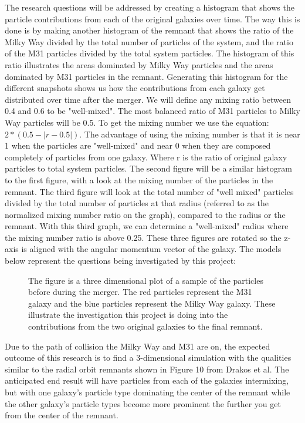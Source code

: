 \documentclass[linenumbers,trackchanges,twocolumn]{aastex7}
\begin{document}
The research questions will be addressed by creating a histogram that shows the particle contributions from each of the original galaxies over time. The way this is done is by making another histogram of the remnant that shows the ratio of the Milky Way divided by the total number of particles of the system, and the ratio of the M31 particles divided by the total system particles. The histogram of this ratio illustrates the areas dominated by Milky Way particles and the areas dominated by M31 particles in the remnant. Generating this histogram for the different snapshots shows us how the contributions from each galaxy get distributed over time after the merger. We will define any mixing ratio between 0.4 and 0.6 to be "well-mixed". The most balanced ratio of M31 particles to Milky Way particles will be 0.5. To get the mixing number we use the equation: \(2*(0.5-|r-0.5|)\). The advantage of using the mixing number is that it is near 1 when the particles are "well-mixed" and near 0 when they are composed completely of particles from one galaxy. Where r is the ratio of original galaxy particles to total system particles. The second figure will be a similar histogram to the first figure, with a look at the mixing number of the particles in the remnant. The third figure will look at the total number of "well mixed" particles divided by the total number of particles at that radius (referred to as the normalized mixing number ratio on the graph), compared to the radius or the remnant. With this third graph, we can determine a "well-mixed" radius where the mixing number ratio is above 0.25. These three figures are rotated so the z-axis is aligned with the angular momentum vector of the galaxy.
The models below represent the questions being investigated by this project:
\begin{figure}[ht!]
\caption{The figure is a three dimensional plot of a sample of the particles before during the merger. The red particles represent the M31 galaxy and the blue particles represent the Milky Way galaxy. These illustrate the investigation this project is doing into the contributions from the two original galaxies to the final remnant.
\label{fig:general}}
\end{figure}

Due to the path of collision the Milky Way and M31 are on, the expected outcome of this research is to find a 3-dimensional simulation with the qualities similar to the radial orbit remnants shown in Figure 10 from Drakos et al. The anticipated end result will have particles from each of the galaxies intermixing, but with one galaxy’s particle type dominating the center of the remnant while the other galaxy's particle types become more prominent the further you get from the center of the remnant. 
\end{document}

